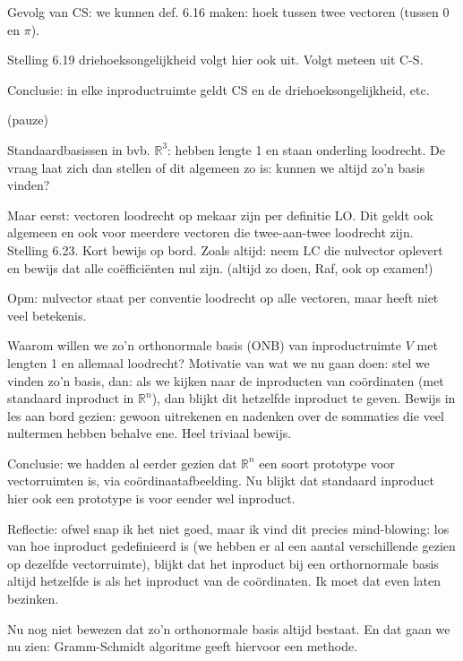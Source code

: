 \documentclass{article}
\begin{document}
Gevolg van CS: we kunnen def. 6.16 maken: hoek tussen twee vectoren (tussen $0$ en $\pi$). 

Stelling 6.19 driehoeksongelijkheid volgt hier ook uit. Volgt meteen uit C-S. 

Conclusie: in elke inproductruimte geldt CS en de driehoeksongelijkheid, etc.  

(pauze) 

Standaardbasissen in bvb. $\mathbb{R}^3$: hebben lengte 1 en staan onderling loodrecht. De vraag laat zich dan stellen of dit algemeen zo is: kunnen we altijd zo'n basis vinden? 

Maar eerst: vectoren loodrecht op mekaar zijn per definitie LO. Dit geldt ook algemeen en ook voor meerdere vectoren die twee-aan-twee loodrecht zijn. Stelling 6.23. Kort bewijs op bord. Zoals altijd: neem LC die nulvector oplevert en bewijs dat alle co\"effici\"enten nul zijn. (altijd zo doen, Raf, ook op examen!) 

Opm: nulvector staat per conventie loodrecht op alle vectoren, maar heeft niet veel betekenis. 

Waarom willen we zo'n orthonormale basis (ONB) van inproductruimte $V$ met lengten 1 en allemaal loodrecht? Motivatie van wat we nu gaan doen: stel we vinden zo'n basis, dan: als we kijken naar de inproducten van co\"ordinaten (met standaard inproduct in $\mathbb{R}^n$), dan blijkt dit hetzelfde inproduct te geven. Bewijs in les aan bord gezien: gewoon uitrekenen en nadenken over de sommaties die veel nultermen hebben behalve ene. Heel triviaal bewijs. 

Conclusie: we hadden al eerder gezien dat $\mathbb{R}^n$ een soort prototype voor vectorruimten is, via co\"ordinaatafbeelding. Nu blijkt dat standaard inproduct hier ook een prototype is voor eender wel inproduct. 

Reflectie: ofwel snap ik het niet goed, maar ik vind dit precies mind-blowing: los van hoe inproduct gedefinieerd is (we hebben er al een aantal verschillende gezien op dezelfde vectorruimte), blijkt dat het inproduct bij een orthornormale basis altijd hetzelfde is als het inproduct van de co\"ordinaten. Ik moet dat even laten bezinken. 

Nu nog niet bewezen dat zo'n orthonormale basis altijd bestaat. En dat gaan we nu zien: Gramm-Schmidt algoritme geeft hiervoor een methode. 
\end{document}
